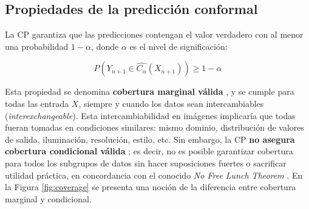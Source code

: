 \subsection{Propiedades de la predicción conformal}

La \acrshort{CP} garantiza que las predicciones contengan el valor verdadero con al menor una probabilidad $1-\alpha$, donde $\alpha$ es el nivel de significación:

$$
P(Y_{n+1} \in \hat{C_\alpha}(X_{n+1})) \ge 1 - \alpha
$$

Esta propiedad se denomina \textbf{cobertura marginal válida} \cite{prinster2024}, y se cumple para todas las entrada $X$, siempre y cuando los datos sean intercambiables (\textit{interexchangeable}). Esta intercambiabilidad en imágenes implicaría que todas fueran tomadas en condiciones similares: mismo dominio, distribución de valores de salida, iluminación, resolución, estilo, etc. Sin embargo, la \acrshort{CP} \textbf{no asegura cobertura condicional válida} \cite{foygel2021}; es decir, no es posible garantizar cobertura para todos los subgrupos de datos sin hacer suposiciones fuertes o sacrificar utilidad práctica, en concordancia con el conocido \textit{No Free Lunch Theorem} \cite{wolpert1997}. En la Figura \ref{fig:coverage} se presenta una noción de la diferencia entre cobertura marginal y condicional. 

